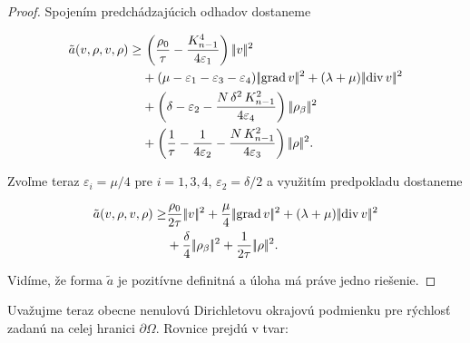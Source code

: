\begin{proof}
Spojením predchádzajúcich odhadov dostaneme

\[
\begin{split}
\tilde a(v,\rho,v,\rho) \geq
&\, \left( \frac{\rho_0}{\tau}-\frac{K_{n-1}^4}{4\varepsilon_1} \right) \n v\n^2\\ 
&+(\mu-\varepsilon_1-\varepsilon_3-\varepsilon_4)\n\grad v\n^2 
+(\lambda+\mu)\n\dv v\n^2 \\
&+\left(\delta-\varepsilon_2-\frac{N\,\delta^2\,K_{n-1}^2}{4\varepsilon_4}\right)\n\rho_\beta\n^2\\
&+\left(\frac{1}{\tau}-\frac{1}{4\varepsilon_2}-\frac{N\,K_{n-1}^2}{4\varepsilon_3}\right)\n\rho\n^2.
\end{split}
\] 

Zvoľme teraz $\varepsilon_i=\mu/4$ pre $i=1,3,4$, $\varepsilon_2=\delta/2$ a
využitím predpokladu  dostaneme

\[
\begin{split}
\tilde a(v,\rho,v,\rho) \geq
&\frac{\rho_0}{2\tau}\n v\n^2 +\frac{\mu}{4}\n\grad v\n^2+(\lambda+\mu)\n\dv v\n^2 \\ 
&+\frac{\delta}{4}\n\rho_\beta\n^2 + \frac{1}{2\tau}\n\rho\n^2.
\end{split}
\] 

Vidíme, že forma $\tilde a$ je pozitívne definitná a úloha
 má práve jedno riešenie. 

\end{proof}


Uvažujme teraz obecne nenulovú Dirichletovu okrajovú podmienku pre rýchlosť
zadanú na celej hranici $\partial \Omega$. 
Rovnice  prejdú v tvar:


